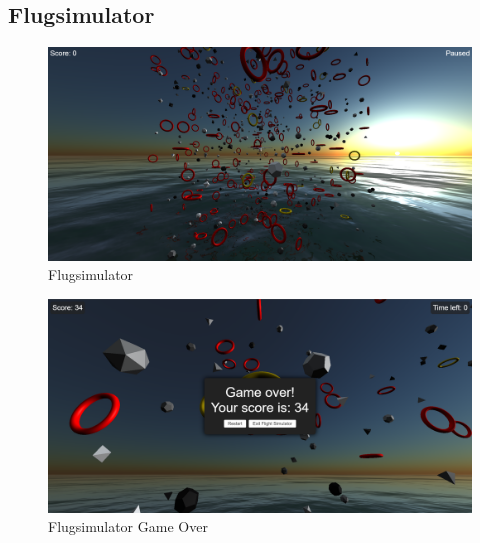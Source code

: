 \subsection{Flugsimulator}
\begin{figure}[H]
  \centering
  \includegraphics[width=1\textwidth]{images/finalproduct/screenshot_flightsim.png}
  \caption{Flugsimulator}
  \label{fig:ScreenshotFlightSim}
\end{figure}\noindent
\begin{figure}[H]
  \centering
  \includegraphics[width=1\textwidth]{images/finalproduct/screenshot_flightsim_score.png}
  \caption{Flugsimulator Game Over}
  \label{fig:ScreenshotFlightSimScore}
\end{figure}\noindent